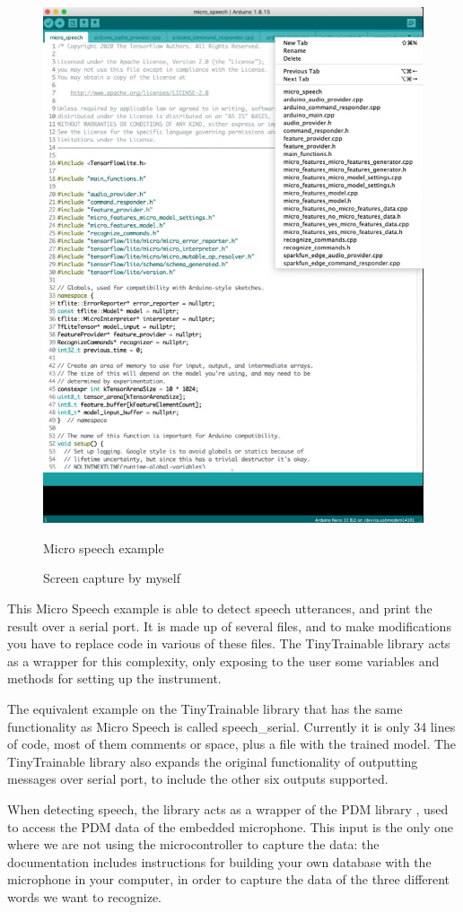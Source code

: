\begin{figure}[ht]
  \centering
  \includegraphics[width=0.75\linewidth,height=0.40\textheight,keepaspectratio]{images/arduino-tensorflow-lite-micro-speech.jpg}
  \caption{Micro speech example}
  \caption*{Screen capture by myself}
  \label{fig:arduino-tensorflow-lite-micro-speech}
\end{figure}

This Micro Speech example is able to detect speech utterances, and print the result over a serial port. It is made up of several files, and to make modifications you have to replace code in various of these files. The TinyTrainable library acts as a wrapper for this complexity, only exposing to the user some variables and methods for setting up the instrument.

The equivalent example on the TinyTrainable library that has the same functionality as Micro Speech is called speech{\_}serial. Currently it is only 34 lines of code, most of them comments or space, plus a file with the trained model. The TinyTrainable library also expands the original functionality of outputting messages over serial port, to include the other six outputs supported.

When detecting speech, the library acts as a wrapper of the PDM library \cite{repository-arduino-PDM}, used to access the \acrfull{PDM} data of the embedded microphone. This input is the only one where we are not using the microcontroller to capture the data: the documentation includes instructions for building your own database with the microphone in your computer, in order to capture the data of the three different words we want to recognize. 

